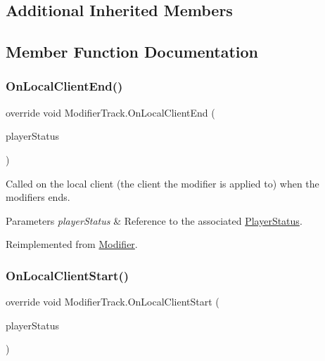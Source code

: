 \subsection*{Additional Inherited Members}


\subsection{Member Function Documentation}
\hypertarget{class_modifier_track_a3a5af2acdd67953efd467e10591a21d4}{}\label{class_modifier_track_a3a5af2acdd67953efd467e10591a21d4} 
\subsubsection{\texorpdfstring{On\+Local\+Client\+End()}{OnLocalClientEnd()}}
{\footnotesize\ttfamily override void Modifier\+Track.\+On\+Local\+Client\+End (\begin{DoxyParamCaption}\item[{\hyperlink{class_player_status}{Player\+Status}}]{player\+Status }\end{DoxyParamCaption})\hspace{0.3cm}{\ttfamily [virtual]}}



Called on the local client (the client the modifier is applied to) when the modifiers ends. 


\begin{DoxyParams}{Parameters}
{\em player\+Status} & Reference to the associated \hyperlink{class_player_status}{Player\+Status}.\\
\hline
\end{DoxyParams}


Reimplemented from \hyperlink{class_modifier_a1ea2aa04b05628c1965570396e390281}{Modifier}.

\hypertarget{class_modifier_track_ab3fb34a4d5f468634ab90837fd4cc3ad}{}\label{class_modifier_track_ab3fb34a4d5f468634ab90837fd4cc3ad} 
\subsubsection{\texorpdfstring{On\+Local\+Client\+Start()}{OnLocalClientStart()}}
{\footnotesize\ttfamily override void Modifier\+Track.\+On\+Local\+Client\+Start (\begin{DoxyParamCaption}\item[{\hyperlink{class_player_status}{Player\+Status}}]{player\+Status }\end{DoxyParamCaption})\hspace{0.3cm}{\ttfamily [virtual]}}



